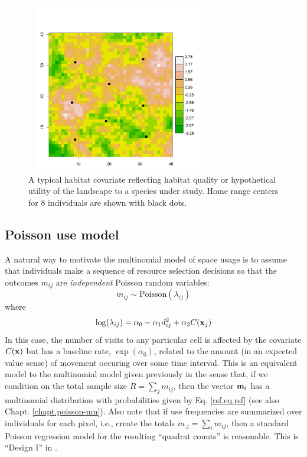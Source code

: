 \begin{figure}[ht]
\centering
\includegraphics[width=3.15in,height=2.93in]{Ch13-RSF/figs/habitat.png}
\caption{A typical habitat covariate reflecting habitat quality or
  hypothetical utility of the landscape to a species under study. Home
  range centers for 8 individuals are shown with black dots.}
\label{rsf.fig.habitat}
\end{figure}


\subsection{Poisson use model}

A natural way to motivate the multinomial model of space usage is to
assume that individuals make a sequence of resource selection
decisions so that the outcomes $m_{ij}$ are {\it
  independent} Poisson random variables:
\[
 m_{ij} \sim \mbox{Poisson}( \lambda_{ij})
\]
where
\[
 \log(\lambda_{ij}) = \alpha_{0} -\alpha_{1} d_{ij}^{2} +  \alpha_{2} C({\bf x}_{j})
\]
In this case, the number of visits to any particular cell is affected
by the covariate $C({\bf x})$ but has a baseline rate, $\exp(\alpha_{0})$,
related to the amount (in an expected value sense) of movement occuring over some time interval.
This is an equivalent model to the multinomial model given previously
in the sense that, if we condition on the total sample size $R = 
\sum_{j} m_{ij}$, then the vector ${\bf m}_{i}$ has a multinomial
distribution with probabilities given by Eq. \ref{rsf.eq.rsf} (see
also Chapt. \ref{chapt.poisson-mn}).  Also note that if use
frequencies are summarized over individuals for each pixel, i.e.,
create the totals $m_{.j} = \sum_i m_{ij}$, then a standard Poisson
regression model for the resulting ``quadrat counts'' is
reasonable. This is ``Design I'' in \citet{manly_etal:2002}.

